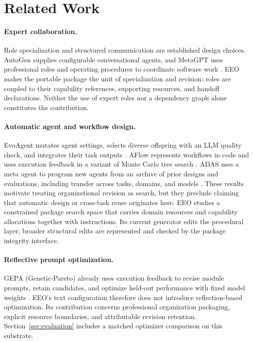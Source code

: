 \section{Related Work}\label{sec:related}
\paragraph{Expert collaboration.}
Role specialization and structured communication are established design choices. AutoGen supplies configurable conversational agents, and MetaGPT uses professional roles and operating procedures to coordinate software work \citep{autogen,metagpt}. EEO makes the portable package the unit of specialization and revision: roles are coupled to their capability references, supporting resources, and handoff declarations. Neither the use of expert roles nor a dependency graph alone constitutes the contribution.

\paragraph{Automatic agent and workflow design.}
EvoAgent mutates agent settings, selects diverse offspring with an LLM quality check, and integrates their task outputs \citep{evoagent}. AFlow represents workflows in code and uses execution feedback in a variant of Monte Carlo tree search \citep{aflow}. ADAS uses a meta agent to program new agents from an archive of prior designs and evaluations, including transfer across tasks, domains, and models \citep{adas}. These results motivate treating organizational revision as search, but they preclude claiming that automatic design or cross-task reuse originates here. EEO studies a constrained package search space that carries domain resources and capability allocations together with instructions. Its current generator edits the procedural layer; broader structural edits are represented and checked by the package integrity interface.

\paragraph{Reflective prompt optimization.}
GEPA (Genetic-Pareto) already uses execution feedback to revise module prompts, retain candidates, and optimize held-out performance with fixed model weights \citep{gepa}. EEO's text configuration therefore does not introduce reflection-based optimization. Its contribution concerns professional organization packaging, explicit resource boundaries, and attributable revision retention. Section~\ref{sec:evaluation} includes a matched optimizer comparison on this substrate.

